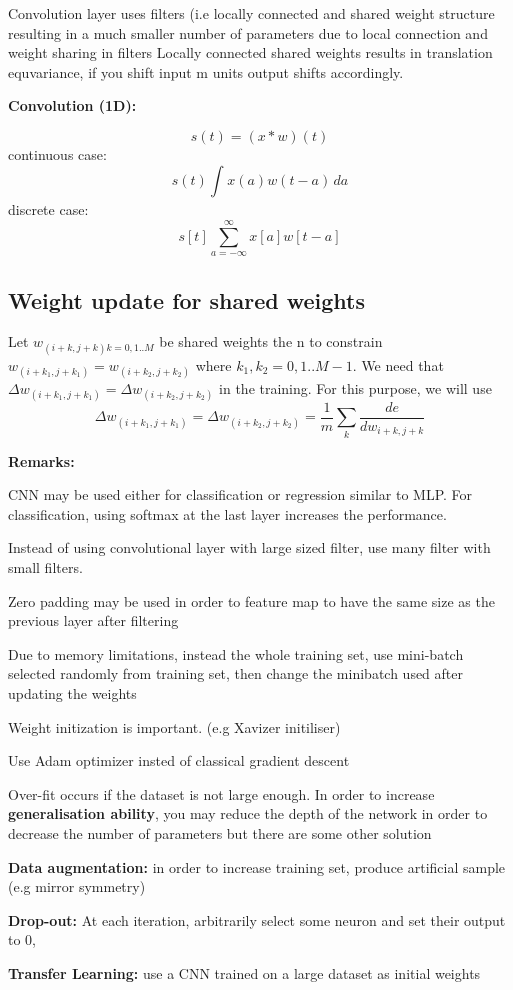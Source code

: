 \documentclass[12pt, a4paper, twoside]{book}
\begin{document}
Convolution layer uses filters (i.e locally connected and shared weight structure resulting in a much smaller number of parameters due to local connection and weight sharing in filters
Locally connected shared weights results in translation equvariance, if you shift input m units output shifts accordingly.

\textbf{Convolution (1D):}

\[s(t) = (x\ast w)(t)\]
continuous case:
\[s(t)\int_{}^{} x(a)w(t-a) \,da \]
discrete case:
\[s[t]\sum_{a=-\infty}^{\infty} x[a]w[t-a] \]

\subsection{Weight update for shared weights}

Let $w_{(i+k,j+k) k=0,1..M}$ be shared weights the n to constrain $w_{(i+k_1,j+k_1)}=w_{(i+k_2,j+k_2)}$ where $k_1,k_2=0,1..M-1$. 
We need that $\Delta w_{(i+k_1,j+k_1)}=\Delta w_{(i+k_2,j+k_2)}$ in the training. For this purpose, we will use
\[\Delta w_{(i+k_1,j+k_1)}=\Delta w_{(i+k_2,j+k_2)}=\frac{1}{m}\sum_k\frac{de}{dw_{i+k,j+k}}\]

\textbf{Remarks:}

\begin{steps}
    \item CNN may be used either for classification or regression similar to MLP. For classification, using softmax at the last layer increases the performance.
    \item Instead of using convolutional layer with large sized filter, use many filter with small filters.
    \item Zero padding may be used in order to feature map to have the same size as the previous layer after filtering
    \item Due to memory limitations, instead the whole training set, use mini-batch selected randomly from training set, then change the minibatch used after updating the weights
    \item Weight initization is important. (e.g Xavizer initiliser)
    \item Use Adam optimizer insted of classical gradient descent
    \item Over-fit occurs if the dataset is not large enough. In order to increase \textbf{generalisation ability}, you may reduce the depth of the network in order to decrease the number of parameters but there are some other solution
    \begin{steps}
        \item \textbf{Data augmentation:} in order to increase training set, produce artificial sample (e.g mirror symmetry)
        \item \textbf{Drop-out:} At each iteration, arbitrarily select some neuron and set their output to 0,
        \item \textbf{Transfer Learning:} use a CNN trained on a large dataset as initial weights  
    \end{steps}
\end{steps}
\end{document}

